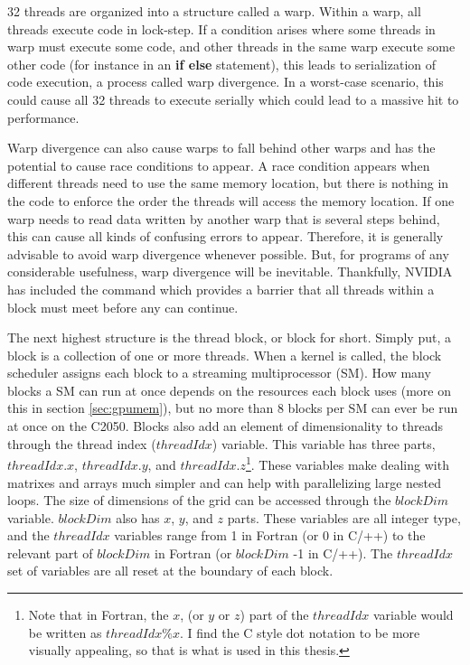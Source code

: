 32 threads are organized into a structure called a warp. Within a warp, all threads execute code in lock-step. If a condition arises where some threads in warp must execute some code, and other threads in the same warp execute some other code (for instance in an \textbf{if else} statement), this leads to serialization of code execution, a process called warp divergence. In a worst-case scenario, this could cause all 32 threads to execute serially which could lead to a massive hit to performance. 

Warp divergence can also cause warps to fall behind other warps and has the potential to cause race conditions to appear. A race condition appears when different threads need to use the same memory location, but there is nothing in the code to enforce the order the threads will access the memory location. If one warp needs to read data written by another warp that is several steps behind, this can cause all kinds of confusing errors to appear. Therefore, it is generally advisable to avoid warp divergence whenever possible. But, for programs of any considerable usefulness, warp divergence will be inevitable. Thankfully, NVIDIA has included the  command which provides a barrier that all threads within a block must meet before any can continue. 

The next highest structure is the thread block, or block for short. Simply put, a block is a collection of one or more threads. When a kernel is called, the block scheduler assigns each block to a streaming multiprocessor (SM). How many blocks a SM can run at once depends on the resources each block uses (more on this in section \ref{sec:gpumem}), but no more than 8 blocks per SM can ever be run at once on the C2050. Blocks also add an element of dimensionality to threads through the thread index ($threadIdx$) variable. This variable has three parts, $threadIdx.x$, $threadIdx.y$, and $threadIdx.z$\footnote{Note that in Fortran, the $x$, (or $y$ or $z$) part of the $threadIdx$ variable would be written as $threadIdx\%x$. I find the C style dot notation to be more visually appealing, so that is what is used in this thesis.}. These variables make dealing with matrixes and arrays much simpler and can help with parallelizing large nested loops. The size of dimensions of the grid can be accessed through the $blockDim$ variable. $blockDim$ also has $x$, $y$, and $z$ parts. These variables are all integer type, and the $threadIdx$ variables range from 1 in Fortran (or 0 in C/++) to the relevant part of $blockDim$ in Fortran (or $blockDim$ -1 in C/++). The $threadIdx$ set of variables are all reset at the boundary of each block. 

